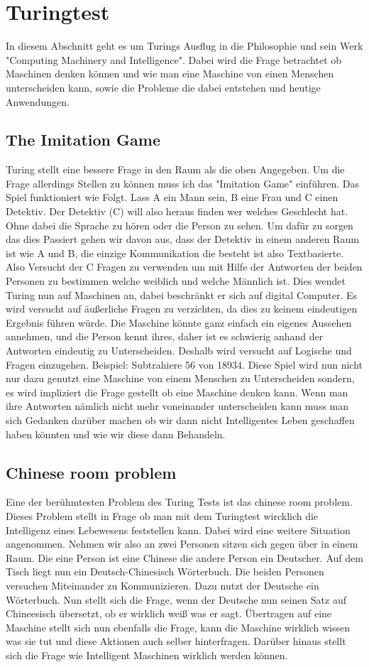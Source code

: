 \section{Turingtest}
In diesem Abschnitt geht es um Turings Ausflug in die Philosophie und sein Werk "Computing Machinery and Intelligence". Dabei wird die Frage betrachtet ob Maschinen denken können und wie man eine Maschine von einen Menschen unterscheiden kann, sowie die Probleme die dabei entstehen und heutige Anwendungen.
\subsection{The Imitation Game}
Turing stellt eine bessere Frage in den Raum als die oben Angegeben. Um die Frage allerdings Stellen zu können muss ich das "Imitation Game" einführen. Das Spiel funktioniert wie Folgt. Lass A ein Mann sein, B eine Frau und C einen Detektiv. Der Detektiv (C) will also heraus finden wer welches Geschlecht hat. Ohne dabei die Sprache zu hören oder die Person zu sehen. Um dafür zu sorgen das dies Passiert gehen wir davon aus, dass der Detektiv in einem anderen Raum ist wie A und B, die einzige Kommunikation die besteht ist also Textbasierte. Also Versucht der C Fragen zu verwenden um mit Hilfe der Antworten der beiden Personen zu bestimmen welche weiblich und welche Männlich ist. Dies wendet Turing nun auf Maschinen an, dabei beschränkt er sich auf digital Computer. Es wird versucht auf äußerliche Fragen zu verzichten, da dies zu keinem eindeutigen Ergebnis führen würde. Die Maschine könnte ganz einfach ein eigenes Aussehen annehmen, und die Person kennt ihres, daher ist es schwierig anhand der Antworten eindeutig zu Unterscheiden. Deshalb wird versucht auf Logische und Fragen einzugehen. Beispiel: Subtrahiere 56 von 18934.\cite{computing} Diese Spiel wird nun nicht nur dazu genutzt eine Maschine von einem Menschen zu Unterscheiden sondern, es wird impliziert die Frage gestellt ob eine Maschine denken kann. Wenn man ihre Antworten nämlich nicht mehr voneinander unterscheiden kann muss man sich Gedanken darüber machen ob wir dann nicht Intelligentes Leben geschaffen haben könnten und wie wir diese dann Behandeln.
\subsection{Chinese room problem}
Eine der berühmtesten Problem des Turing Tests ist das chinese room problem. Dieses Problem stellt in Frage ob man mit dem Turingtest wircklich die Intelligenz eines Lebewesens feststellen kann. Dabei wird eine weitere Situation angenommen. Nehmen wir also an zwei Personen sitzen sich gegen über in einem Raum. Die eine Person ist eine Chinese die andere Person ein Deutscher. Auf dem Tisch liegt nun ein Deutsch-Chinesisch Wörterbuch. Die beiden Personen versuchen Miteinander zu Kommunizieren. Dazu nutzt der Deutsche ein Wörterbuch. Nun stellt sich die Frage, wenn der Deutsche nun seinen Satz auf Chineesisch übersetzt, ob er wirklich weiß was er sagt. Übertragen auf eine Maschine stellt sich nun ebenfalls die Frage, kann die Maschine wirklich wissen was sie tut und diese Aktionen auch selber hinterfragen. Darüber hinaus stellt sich die Frage wie Intelligent Maschinen wirklich werden können.
